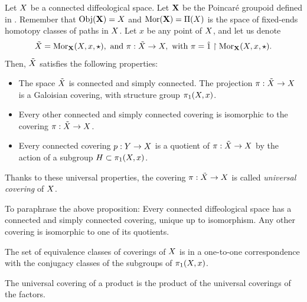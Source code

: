\begin{article}
  \label{The-universal-covering}
  Let $X$ be a connected diffeological space.
  Let ${\mathbf X}$ be the Poincar\'e groupoid defined in .
  Remember that ${\operatorname{Obj}}({\mathbf X}) = X$ and ${\operatorname{Mor}}({\mathbf X}) = \Pi(X)$ is the space of fixed-ends homotopy classes of paths in $X$.
  Let $x$ be any point of $X$,
  and let us denote
  $$%
  \tilde\X = \Mor_\XX(\X,x,\star), \text{ and } \pi : \tilde\X \to \X, \text{ with } \pi = \1 \restriction \Mor_\XX(\X,x,\star).
  $$%
  Then,
  $\tilde {X}$ satisfies the following properties:
  \begin{itemize}
    \item[1.] The space $\tilde{X}$ is connected and simply connected.
    The projection $\pi : \tilde{X} \to X$ is a Galoisian covering,
    with structure group $\pi_1(X,x)$.
    \item[2.] Every other connected and simply connected covering is isomorphic to the covering $\pi : \tilde{X} \to X$.
    \item[3.] Every connected covering $p : Y \to X$ is a quotient of $\pi : \tilde{X} \to X$ by the action of a subgroup $H \subset \pi_1(X,x)$.
  \end{itemize}
  Thanks to these universal properties,
  the covering $\pi : \tilde{X} \to X$ is called {\em universal covering} of $X$.
  
   To paraphrase the above proposition:
   Every connected diffeological space has a connected and simply connected covering,
  unique up to isomorphism.
  Any other covering is isomorphic to one of its quotients.
  
   The set of equivalence classes of coverings of $X$ is in a one-to-one correspondence with the conjugacy classes of the subgroups of $\pi_1(X,x)$.
  
   The universal covering of a product is the product of the
  universal coverings of the factors.
\end{article} %


